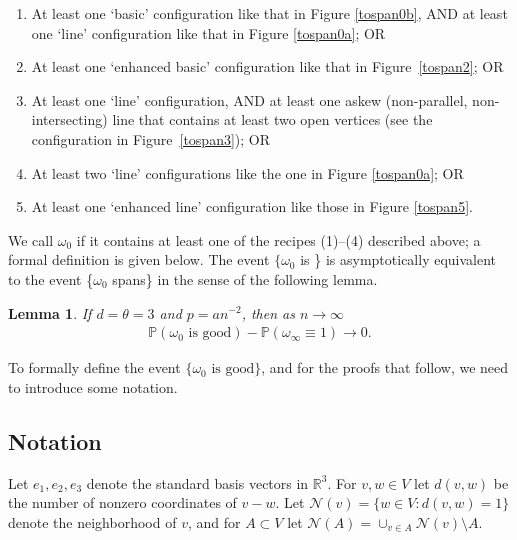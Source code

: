 \documentclass{amsart}
\newcommand{\vect}[1]{{ #1}}
\newcommand{\prob}{\mathbb{P}}
\newcommand{\good}{\text{good}}
\numberwithin{equation}{section}
\newtheorem{lemma}[theorem]{Lemma}
\theoremstyle{definition}
\theoremstyle{remark}
\begin{document}
\begin{enumerate}
\item At least one `basic' configuration like that in Figure \ref{tospan0b}, AND at least one `line' configuration like that in Figure \ref{tospan0a}; OR

\item At least one `enhanced basic' configuration like that in Figure~\ref{tospan2}; OR

\item At least one `line' configuration, AND at least one askew (non-parallel, non-intersecting) line that contains at least two open vertices (see the configuration in Figure~\ref{tospan3}); OR

\item At least two `line' configurations like the one in Figure \ref{tospan0a}; OR

\item At least one `enhanced line' configuration like those in Figure \ref{tospan5}.
\end{enumerate}
We call $\omega_0$ {\em \good} if it contains at least one of the recipes (1)--(4) described above; a formal definition is given below.  The event $\{\omega_0$ is \good\} is asymptotically equivalent to the event \{$\omega_0$ spans\} in the sense of the following lemma.
\begin{lemma} 
\label{good-span-lem}
If $d=\theta=3$ and $p=an^{-2}$, then as $n\to \infty$
\begin{align*}
\prob(\omega_0 \text{ is } \good){} - \prob(\omega_\infty\equiv1) \to  0.
\end{align*}
\end{lemma}
To formally define the event $\{\omega_0 \text{ is } \good\}$, and for the proofs that follow, we need to introduce some notation.

\subsection*{Notation}

Let $\vect{e_1}, \vect{e_2}, \vect{e_3}$ denote the standard basis vectors in $\mathbb{R}^3$.  For $\vect{v},\vect{w}\in V$ let $d(\vect{v},\vect{w})$ be the number of nonzero coordinates of $\vect{v}-\vect{w}$.  Let $\mathcal{N}(\vect{v}) = \{\vect{w} \in V: d(\vect{v},\vect{w}) = 1\}$ denote the neighborhood of $\vect{v}$, and for $A\subset V$ let $\mathcal{N}(A) = \cup_{\vect{v}\in A}\mathcal{N}(\vect{v}) \setminus A$.
\end{document}
